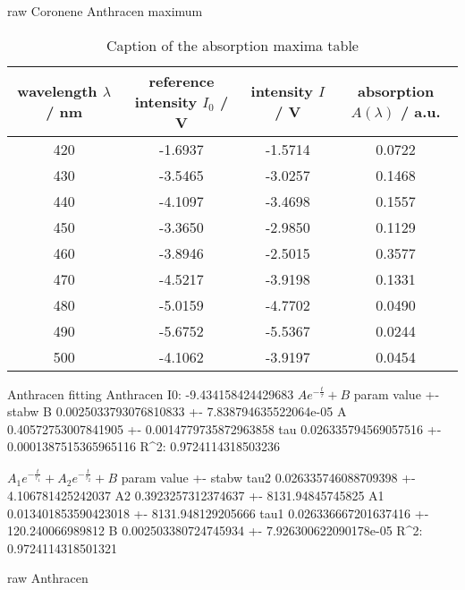 raw Coronene
Anthracen maximum
\begin{table}[H]
\centering
\caption{Caption of the absorption maxima table}
\label{tab:Anthracen_maximum}
\begin{tabular}{cccc}
\toprule
wavelength $\lambda$ / nm & reference intensity $I_0$ / V & intensity $I$ / V & absorption $A(\lambda)$ / a.u. \\
\midrule
\midrule
420 & -1.6937 & -1.5714 & 0.0722 \\
430 & -3.5465 & -3.0257 & 0.1468 \\
440 & -4.1097 & -3.4698 & 0.1557 \\
450 & -3.3650 & -2.9850 & 0.1129 \\
460 & -3.8946 & -2.5015 & 0.3577 \\
470 & -4.5217 & -3.9198 & 0.1331 \\
480 & -5.0159 & -4.7702 & 0.0490 \\
490 & -5.6752 & -5.5367 & 0.0244 \\
500 & -4.1062 & -3.9197 & 0.0454 \\
\bottomrule
\end{tabular}
\end{table}


Anthracen fitting
Anthracen I0:  -9.434158424429683
$A e^{- \frac{t}{\tau}} + B$
param value                 +- stabw                 
B     0.0025033793076810833 +- 7.838794635522064e-05 
A     0.40572753007841905   +- 0.0014779735872963858 
tau   0.026335794569057516  +- 0.0001387515365965116 
R^2: 0.9724114318503236

$A_{1} e^{- \frac{t}{\tau_{1}}} + A_{2} e^{- \frac{t}{\tau_{2}}} + B$
param value                +- stabw                 
tau2  0.026335746088709398 +- 4.106781425242037     
A2    0.3923257312374637   +- 8131.94845745825      
A1    0.013401853590423018 +- 8131.948129205666     
tau1  0.026336667201637416 +- 120.240066989812      
B     0.002503380724745934 +- 7.926300622090178e-05 
R^2: 0.9724114318501321

raw Anthracen
